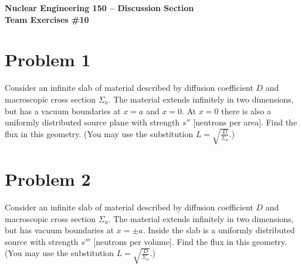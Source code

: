 \documentclass{report}
\begin{document}
\begin{center}
\textbf{\large Nuclear Engineering 150 -- Discussion Section}\\ 
\textbf{Team Exercises \#10}
\end{center}

\section*{Problem 1}

Consider an infinite slab of material described by diffusion coefficient $D$ and macroscopic cross section $\Sigma_a$. The material extends infinitely in two dimensions, but has a vacuum boundaries at $x=a$ and $x=0$. At $x=0$ there is also a uniformly distributed source plane with strength $s''$ [neutrons per area]. Find the flux in this geometry. (You may use the substitution $L = \sqrt{\frac{D}{\Sigma_a}}$.)



\newpage
\section*{Problem 2}

Consider an infinite slab of material described by diffusion coefficient $D$ and macroscopic cross section $\Sigma_a$. The material extends infinitely in two dimensions, but has vacuum boundaries at $x=\pm a$. Inside the slab is a uniformly distributed source with strength $s'''$ [neutrons per volume]. Find the flux in this geometry. (You may use the substitution $L = \sqrt{\frac{D}{\Sigma_a}}$.)



\end{document}
